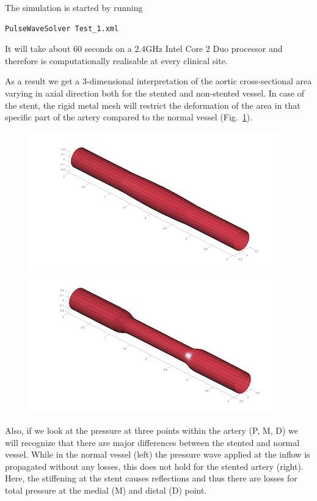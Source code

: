 The simulation is started by running
\begin{lstlisting}[style=BashInputStyle]
PulseWaveSolver Test_1.xml
\end{lstlisting}
It will take about 60 seconds on a 2.4GHz Intel Core 2 Duo processor and 
therefore is computationally realisable at every clinical site.

As a result we get a 3-dimensional interpretation of the aortic cross-sectional
area varying in axial direction both for the stented and non-stented vessel. In
case of the stent, the rigid metal mesh will restrict the deformation of the
area in that specific part of the artery compared to the normal vessel
(Fig.~\ref{f:pulsewave:stented:vessels}).

\begin{figure}
	\includegraphics[width=0.49\linewidth]{img/normal_vessel.jpg}
	\includegraphics[width=0.49\linewidth]{img/stented_vessel.jpg}
	\caption{}
	\label{f:pulsewave:stented:vessels}
\end{figure}

Also, if we look at the pressure at three points within the artery (P, M, D) we
will recognize that there are major differences between the stented and normal
vessel. While in the normal vessel (left) the pressure wave applied at the
inflow is propagated without any losses, this does not hold for the stented
artery (right). Here, the stiffening at the stent causes reflections and thus
there are losses for total pressure at the medial (M) and distal (D) point.

